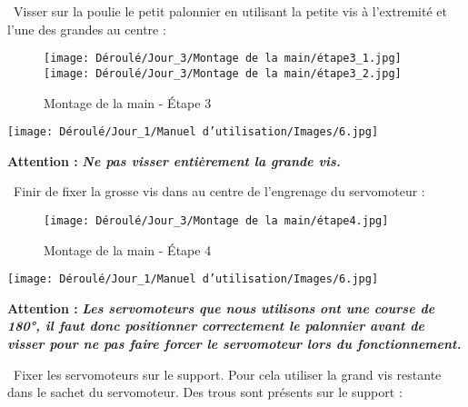\newpage

\begin{flushleft}
\textbullet \, Visser sur la poulie le petit palonnier en utilisant la petite vis à l'extremité et l'une des grandes au centre :

\begin{figure}[!h]
    \centering
    \texttt{[image: Déroulé/Jour\_3/Montage de la main/étape3\_1.jpg]}
    \texttt{[image: Déroulé/Jour\_3/Montage de la main/étape3\_2.jpg]}
    \caption[\'Etape 3]{Montage de la main - \'Etape 3}
    \label{fig:my_label}
\end{figure}

\begin{multicols}{2}
        \texttt{[image: Déroulé/Jour\_1/Manuel d'utilisation/Images/6.jpg]}
    
        \columnbreak
    
        \textbf{\large Attention : }\textbf{\textit{ Ne pas visser entièrement la grande vis.}}\\\vspace{0.2cm}
\end{multicols}

\textbullet \, Finir de fixer la grosse vis dans au centre de l'engrenage du servomoteur :

\begin{figure}[!h]
    \centering
    \texttt{[image: Déroulé/Jour\_3/Montage de la main/étape4.jpg]}
    \caption[\'Etape 4]{Montage de la main - \'Etape 4}
    \label{fig:my_label}
\end{figure}

\begin{multicols}{2}
        \texttt{[image: Déroulé/Jour\_1/Manuel d'utilisation/Images/6.jpg]}
    
        \columnbreak
    
        \textbf{\large Attention : }\textbf{\textit{ Les servomoteurs que nous utilisons ont une course de 180°, il faut donc positionner correctement le palonnier avant de visser pour ne pas faire forcer le servomoteur lors du fonctionnement.}}\\\vspace{0.2cm}
\end{multicols}

\textbullet \, Fixer les servomoteurs sur le support. Pour cela utiliser la grand vis restante dans le sachet du servomoteur. Des trous sont présents sur le support :


\end{flushleft}
